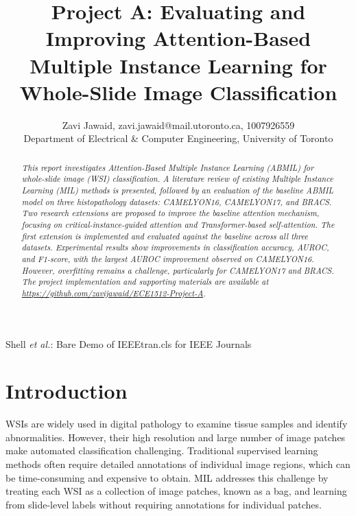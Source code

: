 \documentclass[journal]{IEEEtran}
\begin{document}
\title{Project A: Evaluating and Improving Attention-Based Multiple Instance Learning for Whole-Slide Image Classification}


\author{Zavi Jawaid, zavi.jawaid@mail.utoronto.ca, 1007926559 \\
Department of Electrical \& Computer Engineering, University of Toronto
}


\markboth{}%
{Shell \MakeLowercase{\textit{et al.}}: Bare Demo of IEEEtran.cls for IEEE Journals}

\maketitle

\begin{abstract}
\textit{
This report investigates Attention-Based Multiple Instance Learning (ABMIL) for whole-slide image (WSI) classification. A literature review of existing Multiple Instance Learning (MIL) methods is presented, followed by an evaluation of the baseline ABMIL model on three histopathology datasets: CAMELYON16, CAMELYON17, and BRACS. Two research extensions are proposed to improve the baseline attention mechanism, focusing on critical-instance-guided attention and Transformer-based self-attention. The first extension is implemented and evaluated against the baseline across all three datasets. Experimental results show improvements in classification accuracy, AUROC, and F1-score, with the largest AUROC improvement observed on CAMELYON16. However, overfitting remains a challenge, particularly for CAMELYON17 and BRACS. The project implementation and supporting materials are available at \href{https://github.com/zavijawaid/ECE1512-Project-A}{https://github.com/zavijawaid/ECE1512-Project-A}.
}
\end{abstract}
\IEEEpeerreviewmaketitle



\section{Introduction}
WSIs are widely used in digital pathology to examine tissue samples and identify abnormalities. However, their high resolution and large number of image patches make automated classification challenging. Traditional supervised learning methods often require detailed annotations of individual image regions, which can be time-consuming and expensive to obtain. MIL addresses this challenge by treating each WSI as a collection of image patches, known as a bag, and learning from slide-level labels without requiring annotations for individual patches.
\end{document}
